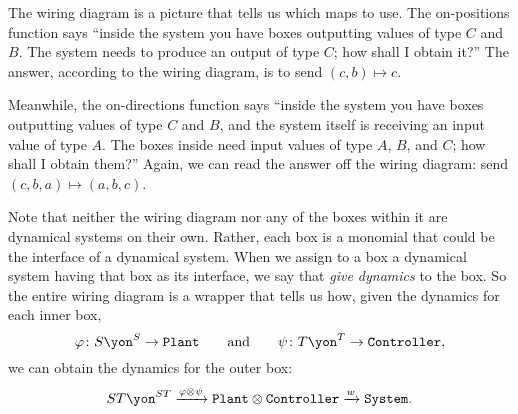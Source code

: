 \documentclass[Book-Poly]{subfiles}
\begin{document}
\begin{example}
The wiring diagram is a picture that tells us which maps to use.
The on-positions function says ``inside the system you have boxes outputting values of type $C$ and $B$.
The system needs to produce an output of type $C$; how shall I obtain it?''
The answer, according to the wiring diagram, is to send $(c,b)\mapsto c$.

Meanwhile, the on-directions function says ``inside the system you have boxes outputting values of type $C$ and $B$, and the system itself is receiving an input value of type $A$.
The boxes inside need input values of type $A$, $B$, and $C$; how shall I obtain them?''
Again, we can read the answer off the wiring diagram: send $(c,b,a)\mapsto (a,b,c)$.

Note that neither the wiring diagram nor any of the boxes within it are dynamical systems on their own.
Rather, each box is a monomial that could be the interface of a dynamical system.
When we assign to a box a dynamical system having that box as its interface, we say that \emph{give dynamics} to the box.
So the entire wiring diagram is a wrapper that tells us how, given the dynamics for each inner box,
\[
\varphi\colon S\yon^S\to\const{Plant}
\qqand
\psi\colon T\yon^T\to\const{Controller},
\]
we can obtain the dynamics for the outer box:
\[
ST\yon^{ST}\To{\varphi\otimes\psi}\const{Plant}\otimes\const{Controller}\To{w}\const{System}.
\]
\end{example}
\end{document}
